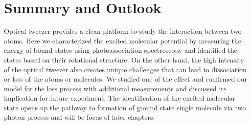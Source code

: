 \section{Summary and Outlook}
Optical tweezer provides a clean platform to study the interaction between two atoms.
Here we characterized the excited molecular potential by measuring
the energy of bound states using photoassociation spectroscopy
and identified the states based on their rotational structure.
On the other hand, the high intensity of the optical tweezer
also creates unique challenges that can lead to dissociation or loss of the atoms or molecules.
We studied one of the effect and confirmed our model for the loss process with
additional measurements and discussed its implication for future experiment.
The identification of the excited molecular state opens up the pathway
to formation of ground state single molecule via two photon process
and will be focus of later chapters.
